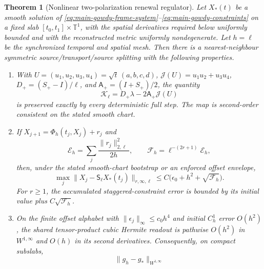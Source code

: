 \documentclass[11pt]{article}
\newtheorem{theorem}{Theorem}[section]
\theoremstyle{definition}
\theoremstyle{remark}
\begin{document}
\begin{theorem}[Nonlinear two-polarization renewal regulator]
\label{thm:main-gowdy-regulator}
Let $X_*(t)$ be a smooth solution of
\eqref{eq:main-gowdy-frame-system}--\eqref{eq:main-gowdy-constraints} on a fixed
slab $[t_0,t_1]\times\mathbb T^1$, with the spatial derivatives required below
uniformly bounded and with the reconstructed metric uniformly nondegenerate.
Let $h=\ell$ be the synchronized temporal and spatial mesh.  Then there is a
nearest-neighbour symmetric source/transport/source splitting with the following
properties.
\begin{enumerate}[label=\textup{(G\arabic*)},leftmargin=3em]
\item With
      $U=(u_1,u_2,u_3,u_4)=\sqrt t\,(a,b,c,d)$,
      $\mathcal J(U)=u_1u_2+u_3u_4$,
      $D_+=(S_+-I)/\ell$, and $\mathsf A_+=(I+S_+)/2$, the quantity
      \begin{equation}
       \boxed{\mathcal K_\ell
       =D_+\lambda-2\mathsf A_+\mathcal J(U)}
       \label{eq:main-gowdy-staggered-momentum}
      \end{equation}
      is preserved exactly by every deterministic full step.  The map is
      second-order consistent on the stated smooth chart.
\item If
      $X_{j+1}=\Phi_h(t_j,X_j)+r_j$ and
      \begin{equation}
       \mathcal E_h=\sum_j\frac{\|r_j\|_{2,\ell}^2}{2h},\qquad
       \mathcal F_h=\ell^{-(2r+1)}\mathcal E_h,
       \label{eq:main-gowdy-residual-energy}
      \end{equation}
      then, under the stated smooth-chart bootstrap or an enforced offset
      envelope,
      \begin{equation}
       \boxed{
       \max_j\|X_j-\mathsf S_\ell X_*(t_j)\|_{r,\infty,\ell}
       \le C\bigl(\epsilon_0+h^2+\sqrt{\mathcal F_h}\bigr).}
       \label{eq:main-gowdy-state-error}
      \end{equation}
      For $r\ge1$, the accumulated staggered-constraint error is bounded by its
      initial value plus $C\sqrt{\mathcal F_h}$.
\item On the finite offset alphabet with
      $\|\epsilon_j\|_\infty\le c_0h^4$ and initial $C_h^1$ error $O(h^2)$,
      the shared tensor-product cubic Hermite readout is pathwise $O(h^2)$ in
      $W^{1,\infty}$ and $O(h)$ in its second derivatives.  Consequently, on
      compact subslabs,
      \begin{equation}
       \boxed{
       \|g_h-g_*\|_{W^{1,\infty}}
}
\end{equation}
\end{enumerate}
\end{theorem}
\end{document}
